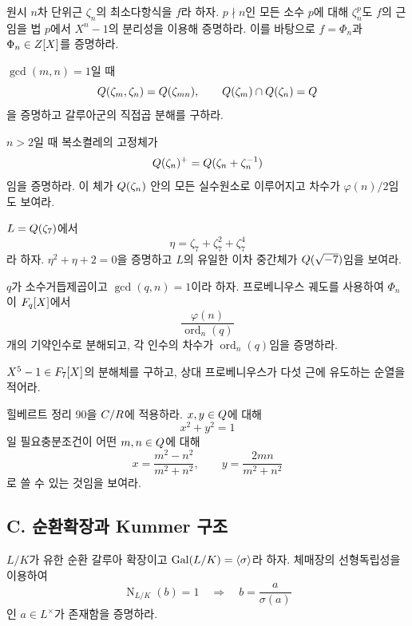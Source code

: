 \begin{exercise}[*]
원시 $n$차 단위근 $\zeta_n$의 최소다항식을 $f$라 하자. $p\nmid n$인 모든 소수 $p$에 대해 $\zeta_n^p$도 $f$의 근임을 법 $p$에서 $X^n-1$의 분리성을 이용해 증명하라. 이를 바탕으로 $f=\Phi_n$과 $\Phi_n\in Z[X]$를 증명하라.
\end{exercise}

\begin{exercise}
$\gcd(m,n)=1$일 때
\[
  Q(\zeta_m,\zeta_n)=Q(\zeta_{mn}),
  \qquad
  Q(\zeta_m)\cap Q(\zeta_n)=Q
\]
을 증명하고 갈루아군의 직접곱 분해를 구하라.
\end{exercise}

\begin{exercise}[*]
$n>2$일 때 복소켤레의 고정체가
\[
  Q(\zeta_n)^+
  =Q(\zeta_n+\zeta_n^{-1})
\]
임을 증명하라. 이 체가 $Q(\zeta_n)$ 안의 모든 실수원소로 이루어지고 차수가 $\varphi(n)/2$임도 보여라.
\end{exercise}

\begin{exercise}
$L=Q(\zeta_7)$에서
\[
  \eta=\zeta_7+\zeta_7^2+\zeta_7^4
\]
라 하자. $\eta^2+\eta+2=0$을 증명하고 $L$의 유일한 이차 중간체가 $Q(\sqrt{-7})$임을 보여라.
\end{exercise}

\begin{exercise}[*]
$q$가 소수거듭제곱이고 $\gcd(q,n)=1$이라 하자. 프로베니우스 궤도를 사용하여 $\Phi_n$이 $F_q[X]$에서
\[
  \frac{\varphi(n)}{\operatorname{ord}_n(q)}
\]
개의 기약인수로 분해되고, 각 인수의 차수가 $\operatorname{ord}_n(q)$임을 증명하라.
\end{exercise}

\begin{exercise}
$X^5-1\in F_7[X]$의 분해체를 구하고, 상대 프로베니우스가 다섯 근에 유도하는 순열을 적어라.
\end{exercise}

\begin{exercise}[*]
힐베르트 정리 90을 $C/R$에 적용하라. $x,y\in Q$에 대해
\[
  x^2+y^2=1
\]
일 필요충분조건이 어떤 $m,n\in Q$에 대해
\[
  x=\frac{m^2-n^2}{m^2+n^2},
  \qquad
  y=\frac{2mn}{m^2+n^2}
\]
로 쓸 수 있는 것임을 보여라.
\end{exercise}

\subsection*{C. 순환확장과 Kummer 구조}

\begin{exercise}
$L/K$가 유한 순환 갈루아 확장이고 $\operatorname{Gal}(L/K)=\langle\sigma\rangle$라 하자. 체매장의 선형독립성을 이용하여
\[
  \operatorname N_{L/K}(b)=1
  \quad\Longrightarrow\quad
  b=\frac{a}{\sigma(a)}
\]
인 $a\in L^\times$가 존재함을 증명하라.
\end{exercise}

